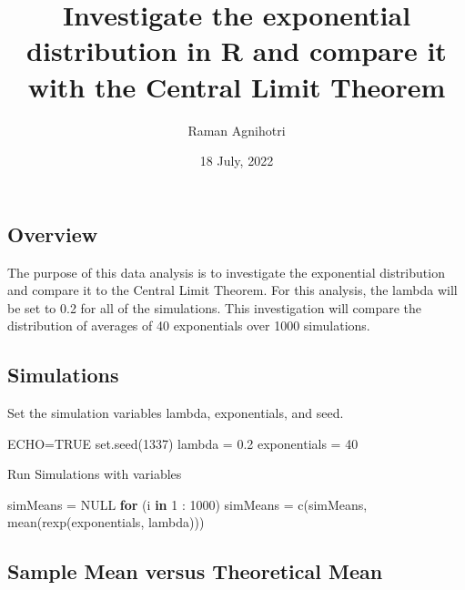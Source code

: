 \documentclass[
]{article}
\title{Investigate the exponential distribution in R and compare it with
the Central Limit Theorem}
\author{Raman Agnihotri}
\date{18 July, 2022}
\newenvironment{Shaded}{\begin{snugshade}}{\end{snugshade}}
\newcommand{\ConstantTok}[1]{\textcolor[rgb]{0.00,0.00,0.00}{#1}}
\newcommand{\ControlFlowTok}[1]{\textcolor[rgb]{0.13,0.29,0.53}{\textbf{#1}}}
\newcommand{\DecValTok}[1]{\textcolor[rgb]{0.00,0.00,0.81}{#1}}
\newcommand{\FloatTok}[1]{\textcolor[rgb]{0.00,0.00,0.81}{#1}}
\newcommand{\FunctionTok}[1]{\textcolor[rgb]{0.00,0.00,0.00}{#1}}
\newcommand{\NormalTok}[1]{#1}
\newcommand{\OtherTok}[1]{\textcolor[rgb]{0.56,0.35,0.01}{#1}}
\newcommand{\SpecialCharTok}[1]{\textcolor[rgb]{0.00,0.00,0.00}{#1}}
\begin{document}
\maketitle

\hypertarget{overview}{%
\subsection{Overview}\label{overview}}

The purpose of this data analysis is to investigate the exponential
distribution and compare it to the Central Limit Theorem. For this
analysis, the lambda will be set to 0.2 for all of the simulations. This
investigation will compare the distribution of averages of 40
exponentials over 1000 simulations.

\hypertarget{simulations}{%
\subsection{Simulations}\label{simulations}}

Set the simulation variables lambda, exponentials, and seed.

\begin{Shaded}
\begin{Highlighting}[]
\NormalTok{ECHO}\OtherTok{=}\ConstantTok{TRUE}
\FunctionTok{set.seed}\NormalTok{(}\DecValTok{1337}\NormalTok{)}
\NormalTok{lambda }\OtherTok{=} \FloatTok{0.2}
\NormalTok{exponentials }\OtherTok{=} \DecValTok{40}
\end{Highlighting}
\end{Shaded}

Run Simulations with variables

\begin{Shaded}
\begin{Highlighting}[]
\NormalTok{simMeans }\OtherTok{=} \ConstantTok{NULL}
\ControlFlowTok{for}\NormalTok{ (i }\ControlFlowTok{in} \DecValTok{1} \SpecialCharTok{:} \DecValTok{1000}\NormalTok{) simMeans }\OtherTok{=} \FunctionTok{c}\NormalTok{(simMeans, }\FunctionTok{mean}\NormalTok{(}\FunctionTok{rexp}\NormalTok{(exponentials, lambda)))}
\end{Highlighting}
\end{Shaded}

\hypertarget{sample-mean-versus-theoretical-mean}{%
\subsection{Sample Mean versus Theoretical
Mean}\label{sample-mean-versus-theoretical-mean}}
\end{document}
